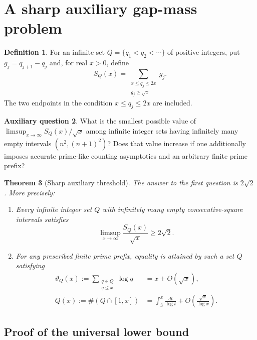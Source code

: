 \documentclass[11pt,a4paper]{article}
\newtheorem{theorem}{Theorem}[section]
\theoremstyle{definition}
\newtheorem{definition}[theorem]{Definition}
\newtheorem{question}[theorem]{Auxiliary question}
\theoremstyle{remark}\newtheorem{remark}[theorem]{Remark}
\begin{document}
\section{A sharp auxiliary gap-mass problem}
\label{sec:threshold}

\begin{definition}
For an infinite set $Q=\{q_1<q_2<\cdots\}$ of positive integers,
put $g_j=q_{j+1}-q_j$ and, for real $x>0$, define
\begin{equation}\label{eq:SQ}
 S_Q(x)=\sum_{\substack{x\le q_j\le2x\\g_j\ge\sqrt x}}g_j.
\end{equation}
The two endpoints in the condition $x\le q_j\le2x$ are included.
\end{definition}

\begin{question}
What is the smallest possible value of
$\limsup_{x\to\infty}S_Q(x)/\sqrt x$ among infinite integer sets
having infinitely many empty intervals $(n^2,(n+1)^2)$?
Does that value increase if one additionally imposes accurate
prime-like counting asymptotics and an arbitrary finite prime prefix?
\end{question}

\begin{theorem}[Sharp auxiliary threshold]\label{thm:sharp}
The answer to the first question is $2\sqrt2$. More precisely:
\begin{enumerate}[label=(\alph*)]
\item Every infinite integer set $Q$ with infinitely many empty
consecutive-square intervals satisfies
\begin{equation}\label{eq:thresholdlower}
 \limsup_{x\to\infty}\frac{S_Q(x)}{\sqrt x}\ge2\sqrt2.
\end{equation}
\item For any prescribed finite prime prefix, equality is attained
by such a set $Q$ satisfying
\begin{align}
 \vartheta_Q(x):=\sum_{\substack{q\in Q\\q\le x}}\log q
 &=x+O(\sqrt x),\label{eq:thetaQ}\\
 Q(x):=\#(Q\cap[1,x])
 &=\int_3^x\frac{dt}{\log t}
   +O\!\left(\frac{\sqrt x}{\log x}\right).
 \label{eq:countQ}
\end{align}
\end{enumerate}
\end{theorem}

\subsection{Proof of the universal lower bound}
\end{document}
